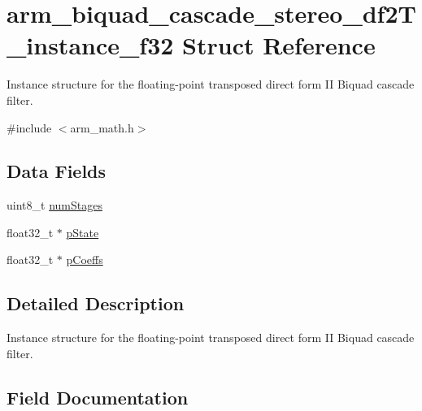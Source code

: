 \hypertarget{structarm__biquad__cascade__stereo__df2_t__instance__f32}{}\section{arm\+\_\+biquad\+\_\+cascade\+\_\+stereo\+\_\+df2\+T\+\_\+instance\+\_\+f32 Struct Reference}
\label{structarm__biquad__cascade__stereo__df2_t__instance__f32}


Instance structure for the floating-\/point transposed direct form II Biquad cascade filter.  




{\ttfamily \#include $<$arm\+\_\+math.\+h$>$}

\subsection*{Data Fields}
\begin{DoxyCompactItemize}
\item 
uint8\+\_\+t \hyperlink{structarm__biquad__cascade__stereo__df2_t__instance__f32_a3615af038f56917909e0370c11bc2ec7}{num\+Stages}
\item 
float32\+\_\+t $\ast$ \hyperlink{structarm__biquad__cascade__stereo__df2_t__instance__f32_a335c87e6fdc4b96601d95a5de8b9c463}{p\+State}
\item 
float32\+\_\+t $\ast$ \hyperlink{structarm__biquad__cascade__stereo__df2_t__instance__f32_aacbb8dd8eeba4b21fc2bb40076405ee3}{p\+Coeffs}
\end{DoxyCompactItemize}


\subsection{Detailed Description}
Instance structure for the floating-\/point transposed direct form II Biquad cascade filter. 

\subsection{Field Documentation}
\mbox{\label{structarm__biquad__cascade__stereo__df2_t__instance__f32_a3615af038f56917909e0370c11bc2ec7}} 
